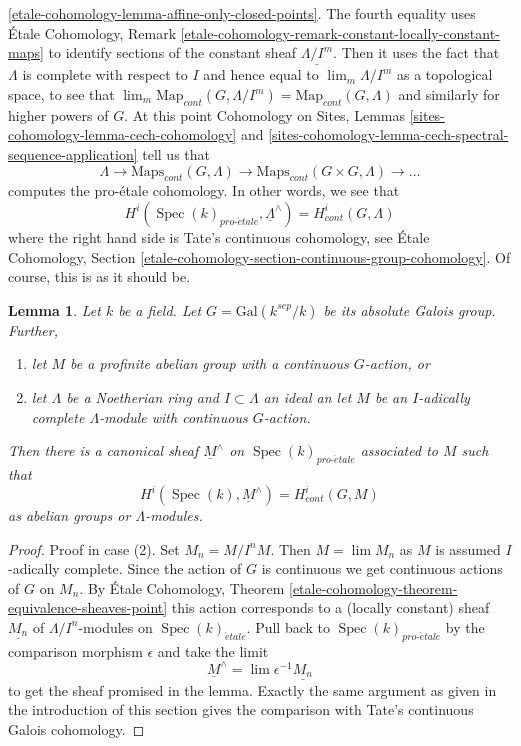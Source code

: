 \documentclass{stacks-project}
\theoremstyle{plain}
\newtheorem{lemma}[subsection]{Lemma}
\theoremstyle{definition}
\theoremstyle{remark}
\numberwithin{equation}{subsection}
\def\lim{\mathop{\mathrm{lim}}\nolimits}
\def\Spec{\mathop{\mathrm{Spec}}}
\def\proetale{{pro\text{-}\acute{e}tale}}
\def\etale{{\acute{e}tale}}
\begin{document}
\ref{etale-cohomology-lemma-affine-only-closed-points}.
The fourth equality uses
\'Etale Cohomology, Remark
\ref{etale-cohomology-remark-constant-locally-constant-maps}
to identify sections of the constant sheaf $\underline{\Lambda/I^m}$.
Then it uses the fact that $\Lambda$ is complete with respect to $I$
and hence equal to $\lim_m \Lambda/I^m$ as a topological space, to see that
$\lim_m \text{Map}_{cont}(G, \Lambda/I^m) = \text{Map}_{cont}(G, \Lambda)$
and similarly for higher powers of $G$.
At this point Cohomology on Sites, Lemmas
\ref{sites-cohomology-lemma-cech-cohomology}  and
\ref{sites-cohomology-lemma-cech-spectral-sequence-application}
tell us that
$$
\Lambda \to \text{Maps}_{cont}(G, \Lambda) \to
\text{Maps}_{cont}(G \times G, \Lambda) \to \ldots
$$
computes the pro-\'etale cohomology. In other words, we see that
$$
H^i(\Spec(k)_\proetale, \underline{\Lambda}^\wedge)
=
H^i_{cont}(G, \Lambda)
$$
where the right hand side is Tate's continuous cohomology, see
\'Etale Cohomology, Section
\ref{etale-cohomology-section-continuous-group-cohomology}.
Of course, this is as it should be.

\begin{lemma}
\label{lemma-more-general-point}
Let $k$ be a field. Let $G = \text{Gal}(k^{sep}/k)$ be its absolute
Galois group. Further, 
\begin{enumerate}
\item let $M$ be a profinite abelian group with a continuous
$G$-action, or
\item let $\Lambda$ be a Noetherian ring and $I \subset \Lambda$ an ideal
an let $M$ be an $I$-adically complete $\Lambda$-module with continuous
$G$-action.
\end{enumerate}
Then there is a canonical sheaf $\underline{M}^\wedge$ on
$\Spec(k)_\proetale$ associated to $M$ such that
$$
H^i(\Spec(k), \underline{M}^\wedge) = H^i_{cont}(G, M)
$$
as abelian groups or $\Lambda$-modules.
\end{lemma}

\begin{proof}
Proof in case (2). Set $M_n = M/I^nM$. Then $M = \lim M_n$ as $M$ is
assumed $I$-adically complete. Since the action of $G$ is continuous
we get continuous actions of $G$ on $M_n$. By \'Etale Cohomology, Theorem
\ref{etale-cohomology-theorem-equivalence-sheaves-point}
this action corresponds to a (locally constant) sheaf
$\underline{M_n}$ of $\Lambda/I^n$-modules on $\Spec(k)_\etale$.
Pull back to $\Spec(k)_\proetale$ by the comparison morphism
$\epsilon$ and take the limit
$$
\underline{M}^\wedge = \lim \epsilon^{-1}\underline{M_n}
$$
to get the sheaf promised in the lemma. Exactly the same argument as
given in the introduction of this section gives the comparison
with Tate's continuous Galois cohomology.
\end{proof}
\end{document}
